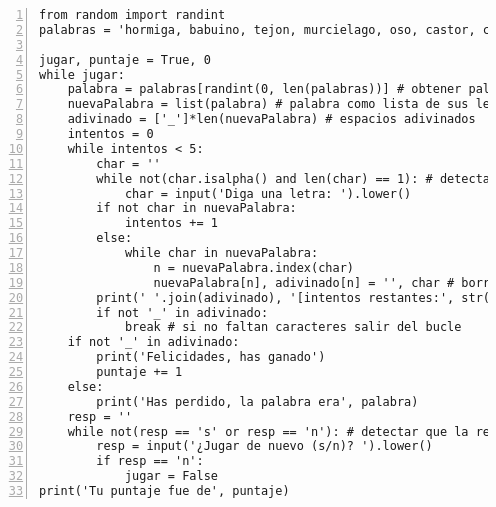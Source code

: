 \documentclass[11pt,twoside]{report}
\begin{document}
\begin{lstlisting}[numbers=left]
from random import randint
palabras = 'hormiga, babuino, tejon, murcielago, oso, castor, camello, gato, almeja, cobra, pantera, coyote, cuervo, ciervo, perro, burro, pato, aguila, huron, zorro, rana, cabra, ganso, halcon, leon, lagarto, llama, topo, mono, alce, raton, mula, salamandra, nutria, buho, panda, loro, paloma, piton, conejo, carnero, rata, cuervo, rinoceronte, salmon, foca, tiburon, oveja, mofeta, perezoso, serpiente, araña, cigüeña, cisne, tigre, sapo, trucha, pavo, tortuga, comadreja, ballena, lobo, wombat, cebra'.split(', ')

jugar, puntaje = True, 0
while jugar:
    palabra = palabras[randint(0, len(palabras))] # obtener palabra de la lista
    nuevaPalabra = list(palabra) # palabra como lista de sus letras
    adivinado = ['_']*len(nuevaPalabra) # espacios adivinados
    intentos = 0
    while intentos < 5:
        char = ''
        while not(char.isalpha() and len(char) == 1): # detecta que sea alfabético y una sola letra
            char = input('Diga una letra: ').lower()
        if not char in nuevaPalabra:
            intentos += 1
        else:
            while char in nuevaPalabra:
                n = nuevaPalabra.index(char)
                nuevaPalabra[n], adivinado[n] = '', char # borrar la letra de la lista y añadirlo a las letras adivinidas
        print(' '.join(adivinado), '[intentos restantes:', str(5-intentos)+']')
        if not '_' in adivinado:
            break # si no faltan caracteres salir del bucle
    if not '_' in adivinado:
        print('Felicidades, has ganado')
        puntaje += 1
    else:
        print('Has perdido, la palabra era', palabra)
    resp = ''
    while not(resp == 's' or resp == 'n'): # detectar que la respuesta sea 's' o 'n'
        resp = input('¿Jugar de nuevo (s/n)? ').lower()
        if resp == 'n':
            jugar = False
print('Tu puntaje fue de', puntaje)
\end{lstlisting}
\end{document}
